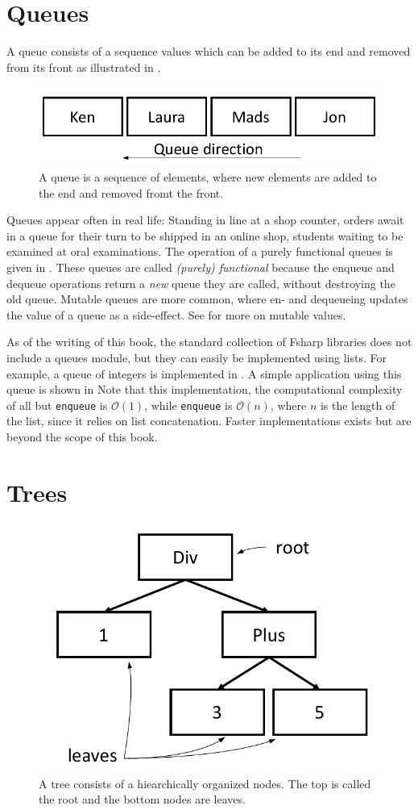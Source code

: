\documentclass[fsharpNotes.tex]{subfiles}
\begin{document}
\section{Queues}
A queue consists of a sequence values which can be added to its end and removed from its front as illustrated in .
\begin{figure}
  \centering
  \includegraphics[width=0.6\linewidth]{queue}
  \caption{A queue is a sequence of elements, where new elements are added to the end and removed fromt the front.}
  \label{fig:queue}
\end{figure}
Queues appear often in real life: Standing in line at a shop counter, orders await in a queue for their turn to be shipped in an online shop, students waiting to be examined at oral examinations. The operation of a purely functional queues is given in .
%
%
These queues are called \emph{(purely) functional} because the enqueue and dequeue operations return a \emph{new} queue they are called, without destroying the old queue. Mutable queues are more common, where en- and dequeueing updates the value of a queue as a side-effect. See  for more on mutable values.

As of the writing of this book, the standard collection of Fsharp libraries does not include a queues module, but they can easily be implemented using lists. For example, a queue of integers is implemented in .
%
%
A simple application using this queue is shown in 
%
%
Note that this implementation, the computational complexity of all but \lstinline{enqueue} is $\mathcal{O}(1)$, while \lstinline{enqueue} is $\mathcal{O}(n)$, where $n$ is the length of the list, since it relies on list concatenation. Faster implementations exists but are beyond the scope of this book.

\section{Trees}
\begin{figure}
  \centering
  \includegraphics[width=0.45\linewidth]{tree}
  \caption{A tree consists of a hiearchically organized nodes. The top is called the root and the bottom nodes are leaves.}
  \label{fig:queue}
\end{figure}
\end{document}
